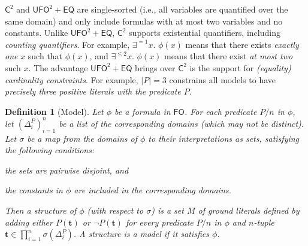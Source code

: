 \documentclass{article}
\newtheorem{definition}{Definition}
\theoremstyle{remark}
\newcommand{\Ctwo}{$\mathsf{C}^{2}$}
\newcommand{\FO}{$\mathsf{FO}$}
\newcommand{\UFO}{$\mathsf{UFO}^{2} + \mathsf{EQ}$}
\begin{document}
\Ctwo{} and \UFO{} are single-sorted (i.e., all variables are quantified over
the same domain) and only include formulas with at most two variables and no
constants. Unlike \UFO{}, \Ctwo{} supports existential quantifiers, including
\emph{counting quantifiers}. For example, $\exists^{=1} x\text{. }\phi(x)$ means
that there exists \emph{exactly one} $x$ such that $\phi(x)$, and
$\exists^{\le 2} x\text{. }\phi(x)$ means that there exist \emph{at most two}
such $x$. The advantage \UFO{} brings over \Ctwo{} is the support for
\emph{(equality) cardinality constraints}. For example, $|P| = 3$ constrains all
models to have \emph{precisely three positive literals with the predicate $P$}.

\begin{definition}[Model]\label{def:model}
  Let $\phi$ be a formula in \FO{}. For each predicate $P/n$ in $\phi$, let
  ${(\Delta_{i}^{P})}_{i=1}^{n}$ be a list of the corresponding domains (which
  may not be distinct). Let $\sigma$ be a map from the domains of $\phi$ to
  their interpretations as sets, satisfying the following conditions:
  \begin{enumerate*}[label=(\roman*)]
    \item the sets are pairwise disjoint, and
    \item the constants in $\phi$ are included in the corresponding domains.
  \end{enumerate*}
  Then a \emph{structure} of $\phi$ (with respect to $\sigma$) is a set $M$ of
  ground literals defined by adding either $P(\mathbf{t})$ or
  $\neg P(\mathbf{t})$ for every predicate $P/n$ in $\phi$ and $n$-tuple
  $\mathbf{t} \in \prod_{i=1}^{n} \sigma(\Delta_{i}^{P})$. A structure is a
  \emph{model} if it satisfies $\phi$.
\end{definition}
\end{document}
